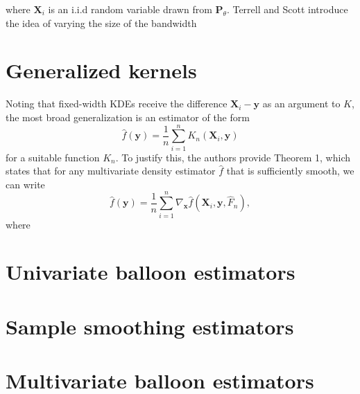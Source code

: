 \documentclass{article}
\begin{document}
where $\mathbf{X}_i$ is an i.i.d random variable drawn from $\mathbf{P}_\theta$. Terrell and Scott introduce the idea of varying the size of the bandwidth

\section{Generalized kernels}
Noting that fixed-width KDEs receive the difference $\mathbf{X}_i-\mathbf{y}$ as an argument to $K$, the most broad generalization is an estimator of the form 
\begin{equation}\label{eq:gen-kde}
    \hat{f}(\mathbf{y}) = \frac{1}{n} \sum_{i=1}^n K_n(\mathbf{X}_i,\mathbf{y}) 
\end{equation}
for a suitable function $K_n$. To justify this, the authors provide Theorem 1, which states that for any multivariate density estimator $\hat{f}$ that is sufficiently smooth, we can write 
\begin{equation}\label{eq:thm1}
    \hat{f}(\mathbf{y}) = \frac{1}{n} \sum_{i=1}^n \nabla_{\mathbf{x}} \hat{f}(\mathbf{X}_i,\mathbf{y},\hat{F}_n), 
\end{equation}
where 

\section{Univariate balloon estimators}

\section{Sample smoothing estimators}

\section{Multivariate balloon estimators}
\end{document}
